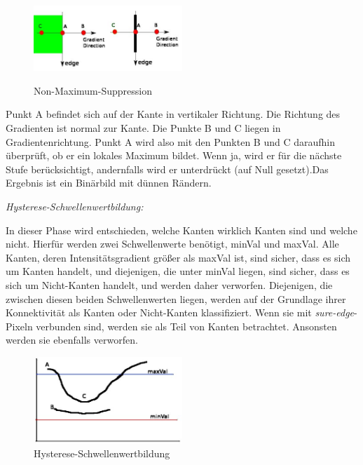 \begin{compactenum}
\begin{compactenum}
        \begin{figure}[H]
            \centering
            \includegraphics[width=0.5\textwidth]{pics/nms.jpg}
            \caption{Non-Maximum-Suppression}
            \cite{NMSPic}
            \label{fig:anpr:edge:nms}
            \end{figure}
            Punkt A befindet sich auf der Kante in vertikaler Richtung. Die Richtung des Gradienten ist normal zur Kante. Die Punkte B und C liegen in Gradientenrichtung. Punkt A wird also mit den Punkten B und C daraufhin überprüft, ob er ein lokales Maximum bildet. Wenn ja, wird er für die nächste Stufe berücksichtigt, andernfalls wird er unterdrückt (auf Null gesetzt).Das Ergebnis ist ein Binärbild mit dünnen Rändern.
    \end{compactenum}
    \item \textit{Hysterese-Schwellenwertbildung: }
    \begin{compactenum}
        \item  In dieser Phase wird entschieden, welche Kanten wirklich Kanten sind und welche nicht. Hierfür werden zwei Schwellenwerte benötigt, minVal und maxVal. Alle Kanten, deren Intensitätsgradient größer als maxVal ist, sind sicher, dass es sich um Kanten handelt, und diejenigen, die unter minVal liegen, sind sicher, dass es sich um Nicht-Kanten handelt, und werden daher verworfen. Diejenigen, die zwischen diesen beiden Schwellenwerten liegen, werden auf der Grundlage ihrer Konnektivität als Kanten oder Nicht-Kanten klassifiziert. Wenn sie mit \textit{sure-edge}-Pixeln verbunden sind, werden sie als Teil von Kanten betrachtet. Ansonsten werden sie ebenfalls verworfen.
        \begin{figure}[H]
            \centering
            \includegraphics[width=0.5\textwidth]{pics/hysteresis.jpg}
            \caption{Hysterese-Schwellenwertbildung}

\end{figure}
\end{compactenum}
\end{compactenum}
